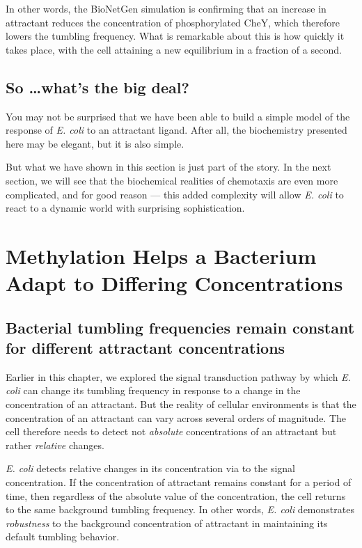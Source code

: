 In other words, the BioNetGen simulation is confirming that an increase in attractant reduces the concentration of phosphorylated CheY, which therefore lowers the tumbling frequency. What is remarkable about this is how quickly it takes place, with the cell attaining a new equilibrium in a fraction of a second.


\FloatBarrier
{}
\subsection{So \ldots what's the big deal?}

You may not be surprised that we have been able to build a simple model of the response of \textit{E. coli} to an attractant ligand. After all, the biochemistry presented here may be elegant, but it is also simple.

But what we have shown in this section is just part of the story. In the next section, we will see that the biochemical realities of chemotaxis are even more complicated, and for good reason --- this added complexity will allow \textit{E. coli} to react to a dynamic world with surprising sophistication.\\

\FloatBarrier
{}

\section{Methylation Helps a Bacterium Adapt to Differing Concentrations}
\label{sec:methylation}

\subsection{Bacterial tumbling frequencies remain constant for different attractant concentrations}

Earlier in this chapter, we explored the signal transduction pathway by which \textit{E. coli} can change its tumbling frequency in response to a change in the concentration of an attractant. But the reality of cellular environments is that the concentration of an attractant can vary across several orders of magnitude. The cell therefore needs to detect not \textit{absolute} concentrations of an attractant but rather \textit{relative} changes.

\textit{E. coli} detects relative changes in its concentration via  to the signal concentration. If the concentration of attractant remains constant for a period of time, then regardless of the absolute value of the concentration, the cell returns to the same background tumbling frequency. In other words, \textit{E. coli} demonstrates \textit{robustness} to the background concentration of attractant in maintaining its default tumbling behavior.

